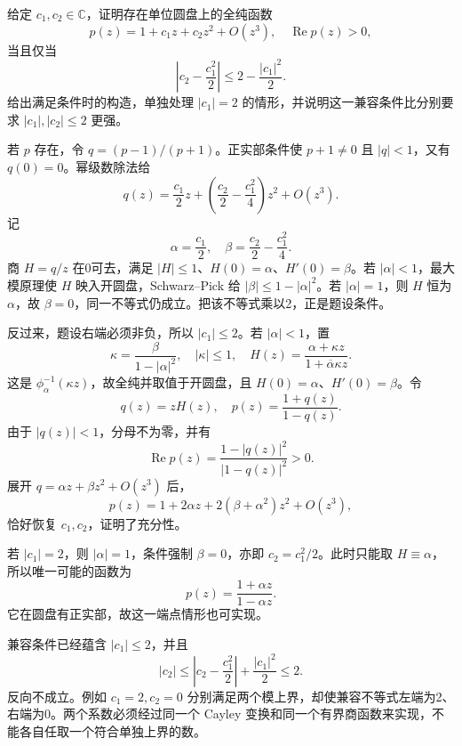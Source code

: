 \begin{exercise}\label{b3:ex:06-5}
给定 \(c_1,c_2\in\mathbb C\)，证明存在单位圆盘上的全纯函数
\[
 p(z)=1+c_1z+c_2z^2+O(z^3),\quad \operatorname{Re}p(z)>0,
\]
当且仅当
\[
 \left|c_2-\frac{c_1^2}{2}\right|
 \le2-\frac{|c_1|^2}{2}.
\]
给出满足条件时的构造，单独处理 \(|c_1|=2\) 的情形，并说明这一兼容条件比分别要求 \(|c_1|,|c_2|\le2\) 更强。
\end{exercise}
\begin{solution}
若 \(p\) 存在，令 \(q=(p-1)/(p+1)\)。正实部条件使 \(p+1\ne0\) 且 \(|q|<1\)，又有 \(q(0)=0\)。幂级数除法给
\[
 q(z)=\frac{c_1}{2}z+
 \left(\frac{c_2}{2}-\frac{c_1^2}{4}\right)z^2+O(z^3).
\]
记
\[
 \alpha=\frac{c_1}{2},\quad
 \beta=\frac{c_2}{2}-\frac{c_1^2}{4}.
\]
商 \(H=q/z\) 在0可去，满足 \(|H|\le1\)、\(H(0)=\alpha\)、\(H'(0)=\beta\)。若 \(|\alpha|<1\)，最大模原理使 \(H\) 映入开圆盘，Schwarz--Pick 给
\(|\beta|\le1-|\alpha|^2\)。若 \(|\alpha|=1\)，则 \(H\) 恒为 \(\alpha\)，故 \(\beta=0\)，同一不等式仍成立。把该不等式乘以2，正是题设条件。

反过来，题设右端必须非负，所以 \(|c_1|\le2\)。若 \(|\alpha|<1\)，置
\[
 \kappa=\frac{\beta}{1-|\alpha|^2},\quad |\kappa|\le1,\quad
 H(z)=\frac{\alpha+\kappa z}{1+\overline\alpha\kappa z}.
\]
这是 \(\phi_\alpha^{-1}(\kappa z)\)，故全纯并取值于开圆盘，且 \(H(0)=\alpha\)、\(H'(0)=\beta\)。令
\[
 q(z)=zH(z),\quad p(z)=\frac{1+q(z)}{1-q(z)}.
\]
由于 \(|q(z)|<1\)，分母不为零，并有
\[
 \operatorname{Re}p(z)
 =\frac{1-|q(z)|^2}{|1-q(z)|^2}>0.
\]
展开 \(q=\alpha z+\beta z^2+O(z^3)\) 后，
\[
 p(z)=1+2\alpha z+2(\beta+\alpha^2)z^2+O(z^3),
\]
恰好恢复 \(c_1,c_2\)，证明了充分性。

若 \(|c_1|=2\)，则 \(|\alpha|=1\)，条件强制 \(\beta=0\)，亦即 \(c_2=c_1^2/2\)。此时只能取 \(H\equiv\alpha\)，所以唯一可能的函数为
\[
 p(z)=\frac{1+\alpha z}{1-\alpha z}.
\]
它在圆盘有正实部，故这一端点情形也可实现。

兼容条件已经蕴含 \(|c_1|\le2\)，并且
\[
 |c_2|
 \le\left|c_2-\frac{c_1^2}{2}\right|+\frac{|c_1|^2}{2}
 \le2.
\]
反向不成立。例如 \(c_1=2,c_2=0\) 分别满足两个模上界，却使兼容不等式左端为2、右端为0。两个系数必须经过同一个 Cayley 变换和同一个有界商函数来实现，不能各自任取一个符合单独上界的数。
\end{solution}

